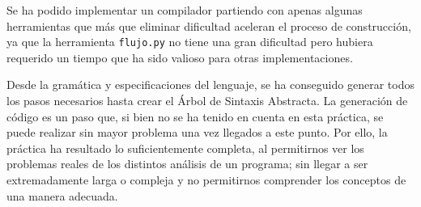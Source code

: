 \documentclass[11pt]{article}
\begin{document}
Se ha podido implementar un compilador partiendo con apenas algunas herramientas que más que eliminar dificultad aceleran el proceso de construcción, ya que la herramienta \lstinline[language=Python]{flujo.py} no tiene una gran dificultad pero hubiera requerido un tiempo que ha sido valioso para otras implementaciones. 

Desde la gramática y especificaciones del lenguaje, se ha conseguido generar todos los pasos necesarios hasta crear el Árbol de Sintaxis Abstracta. La generación de código es un paso que, si bien no se ha tenido en cuenta en esta práctica, se puede realizar sin mayor problema una vez llegados a este punto. Por ello, la práctica ha resultado lo suficientemente completa, al permitirnos ver los problemas reales de los distintos análisis de un programa; sin llegar a ser extremadamente larga o compleja y no permitirnos comprender los conceptos de una manera adecuada.
\end{document}
